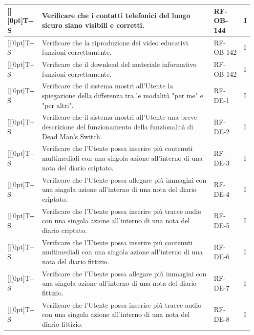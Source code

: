 \documentclass[a4paper,12pt]{article}
\newcounter{testsys}
\newcommand{\systestcode}{%
  \raisebox{0pt}[\height][0pt]{\hypertarget{T-\arabic{testsys}-S}{}}T-\arabic{testsys}-S%
}
\begin{document}
\begin{longtable}{| >{\centering\arraybackslash}p{} | >{\raggedright\arraybackslash}p{} | >{\centering\arraybackslash}p{} | >{\centering\arraybackslash}p{} |}
\stepcounter{testsys} \systestcode & Verificare che i contatti telefonici del luogo sicuro siano visibili e corretti. & RF-OB-144 & I \\
\hline

\stepcounter{testsys} \systestcode & Verificare che la riproduzione dei video educativi funzioni correttamente. & RF-OB-142 & I \\
\hline

\stepcounter{testsys} \systestcode & Verificare che il download del materiale informativo funzioni correttamente. & RF-OB-142 & I \\
\hline

\stepcounter{testsys} \systestcode & Verificare che il sistema mostri all'Utente la spiegazione della differenza tra le modalità "per me" e "per altri". & RF-DE-1 & I \\
\hline

\stepcounter{testsys} \systestcode & Verificare che il sistema mostri all'Utente una breve descrizione del funzionamento della funzionalità di Dead Man's Switch. & RF-DE-2 & I \\
\hline

\stepcounter{testsys} \systestcode & Verificare che l'Utente possa inserire più contenuti multimediali con una singola azione all'interno di una nota del diario criptato. & RF-DE-3 & I \\
\hline

\stepcounter{testsys} \systestcode & Verificare che l'Utente possa allegare più immagini con una singola azione all'interno di una nota del diario criptato. & RF-DE-4 & I \\
\hline

\stepcounter{testsys} \systestcode & Verificare che l'Utente possa inserire più tracce audio con una singola azione all'interno di una nota del diario criptato. & RF-DE-5 & I \\
\hline

\stepcounter{testsys} \systestcode & Verificare che l'Utente possa inserire più contenuti multimediali con una singola azione all'interno di una nota del diario fittizio. & RF-DE-6 & I \\
\hline

\stepcounter{testsys} \systestcode & Verificare che l'Utente possa allegare più immagini con una singola azione all'interno di una nota del diario fittizio. & RF-DE-7 & I \\
\hline

\stepcounter{testsys} \systestcode & Verificare che l'Utente possa inserire più tracce audio con una singola azione all'interno di una nota del diario fittizio. & RF-DE-8 & I \\
\hline


\end{longtable}
\end{document}
